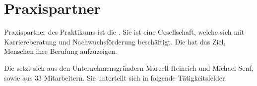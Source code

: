 
\chapter{Praxispartner}




Praxispartner des Praktikums ist die . Sie ist eine Gesellschaft, welche sich mit Karriereberatung und Nachwuchsförderung beschäftigt. Die  hat das Ziel, Menschen ihre Berufung aufzuzeigen.\\
\parencite{hero-society}

Die  setzt sich aus den Unternehmensgründern Marcell Heinrich und Michael Senf, sowie aus 33 Mitarbeitern. Sie  unterteilt sich in folgende Tätigkeitsfelder:


